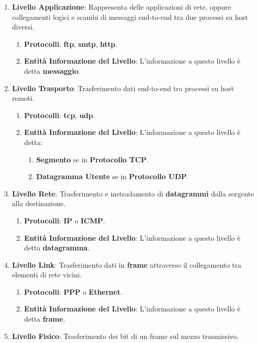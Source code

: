 \documentclass{article}
\begin{document}
\begin{enumerate}
    \item \textbf{Livello Applicazione}: Rappresenta delle applicazioni di rete, oppure collegamenti logici e scambi di messaggi end-to-end tra due processi su host diversi.
    \begin{enumerate}
        \item \textbf{Protocolli}: \textbf{ftp}, \textbf{smtp}, \textbf{http}.
        \item \textbf{Entità Informazione del Livello}: L'informazione a questo livello è detta \textbf{messaggio}.
    \end{enumerate}

    \newpage

    \item \textbf{Livello Trasporto}: Trasferimento dati end-to-end tra processi su host remoti.
    \begin{enumerate}
        \item \textbf{Protocolli}: \textbf{tcp}, \textbf{udp}.
        \item \textbf{Entità Informazione del Livello}: L'informazione a questo livello è detta:
        \begin{enumerate}
            \item \textbf{Segmento} se in \textbf{Protocollo TCP}.
            \item \textbf{Datagramma Utente} se in \textbf{Protocollo UDP}.
        \end{enumerate}
    \end{enumerate}
    \item \textbf{Livello Rete}: Trasferimento e instradamento di \textbf{datagrammi} dalla sorgente alla destinazione. 
    \begin{enumerate}
        \item \textbf{Protocolli}: \textbf{IP} o \textbf{ICMP}.
        \item \textbf{Entità Informazione del Livello}: L'informazione a questo livello è detta \textbf{datagramma}.
    \end{enumerate}
    \item \textbf{Livello Link}: Trasferimento dati in \textbf{frame} attraverso il collegamento tra elementi di rete vicini.
    \begin{enumerate}
        \item \textbf{Protocolli}: \textbf{PPP} o \textbf{Ethernet}.
        \item \textbf{Entità Informazione del Livello}: L'informazione a questo livello è detta \textbf{frame}.
    \end{enumerate} 
    \item \textbf{Livello Fisico}: Trasferimento dei bit di un frame sul mezzo trasmissivo.
\end{enumerate}
\end{document}
